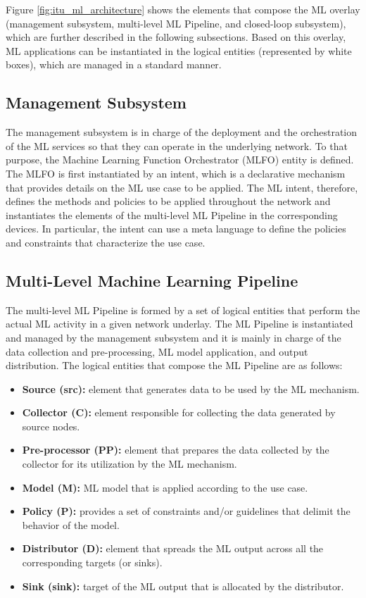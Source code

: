 \documentclass[twocolumn]{article}
\begin{document}
Figure \ref{fig:itu_ml_architecture} shows the elements that compose the ML overlay (management subsystem, multi-level ML Pipeline, and closed-loop subsystem), which are further described in the following subsections. Based on this overlay, ML applications can be instantiated in the logical entities (represented by white boxes), which are managed in a standard manner. %

\subsection{Management Subsystem} 
The management subsystem is in charge of the deployment and the orchestration of the ML services so that they can operate in the underlying network. To that purpose, the Machine Learning Function Orchestrator (MLFO) entity is defined. The MLFO is first instantiated by an intent, which is a declarative mechanism that provides details on the ML use case to be applied. The ML intent, therefore, defines the methods and policies to be applied throughout the network and instantiates the elements of the multi-level ML Pipeline in the corresponding devices. In particular, the intent can use a meta language to define the policies and constraints that characterize the use case.

\subsection{Multi-Level Machine Learning Pipeline} 
The multi-level ML Pipeline is formed by a set of logical entities that perform the actual ML activity in a given network underlay. The ML Pipeline is instantiated and managed by the management subsystem and it is mainly in charge of the data collection and pre-processing, ML model application, and output distribution. The logical entities that compose the ML Pipeline are as follows:
\begin{itemize}
    \item \textbf{Source (src):} element that generates data to be used by the ML mechanism.
    \item \textbf{Collector (C):} element responsible for collecting the data generated by source nodes.
    \item \textbf{Pre-processor (PP):} element that prepares the data collected by the collector for its utilization by the ML mechanism.
    \item \textbf{Model (M):} ML model that is applied according to the use case.
    \item \textbf{Policy (P):} provides a set of constraints and/or guidelines that delimit the behavior of the model.
    \item \textbf{Distributor (D):} element that spreads the ML output across all the corresponding targets (or sinks).
    \item \textbf{Sink (sink):} target of the ML output that is allocated by the distributor.
\end{itemize}
\end{document}
